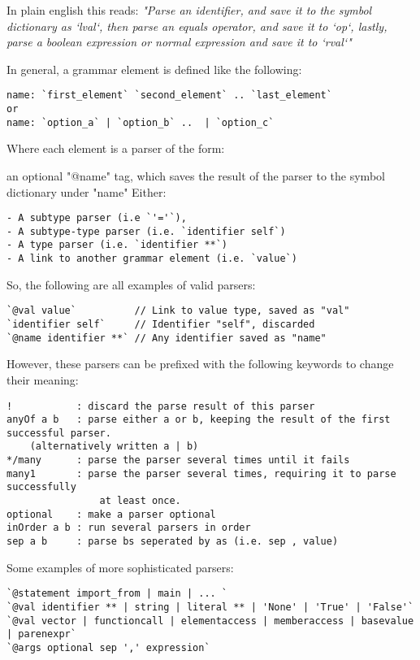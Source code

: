 \documentclass{article}
\begin{document}
In plain english this reads:
\textit{"Parse an identifier, and save it to the symbol dictionary as `lval`, then parse an equals operator, and save it to `op`, lastly, parse a boolean expression or normal expression and save it to `rval`"}

In general, a grammar element is defined like the following:

\begin{verbatim}
name: `first_element` `second_element` .. `last_element`
or
name: `option_a` | `option_b` ..  | `option_c`
\end{verbatim}

Where each element is a parser of the form:

an optional "@name" tag, which saves the result of the parser to the symbol dictionary under "name"
Either:
\begin{verbatim}
- A subtype parser (i.e `'='`),
- A subtype-type parser (i.e. `identifier self`)
- A type parser (i.e. `identifier **`)
- A link to another grammar element (i.e. `value`)
\end{verbatim}

So, the following are all examples of valid parsers:
\begin{verbatim}
`@val value`          // Link to value type, saved as "val"
`identifier self`     // Identifier "self", discarded
`@name identifier **` // Any identifier saved as "name"
\end{verbatim}

However, these parsers can be prefixed with the following 
  keywords to change their meaning:

\begin{verbatim}
!           : discard the parse result of this parser
anyOf a b   : parse either a or b, keeping the result of the first successful parser. 
    (alternatively written a | b) 
*/many      : parse the parser several times until it fails
many1       : parse the parser several times, requiring it to parse successfully 
                at least once.
optional    : make a parser optional
inOrder a b : run several parsers in order
sep a b     : parse bs seperated by as (i.e. sep , value) 
\end{verbatim}

Some examples of more sophisticated parsers:

\begin{verbatim}
`@statement import_from | main | ... ` 
`@val identifier ** | string | literal ** | 'None' | 'True' | 'False'`
`@val vector | functioncall | elementaccess | memberaccess | basevalue | parenexpr`
`@args optional sep ',' expression`
\end{verbatim}
\end{document}
